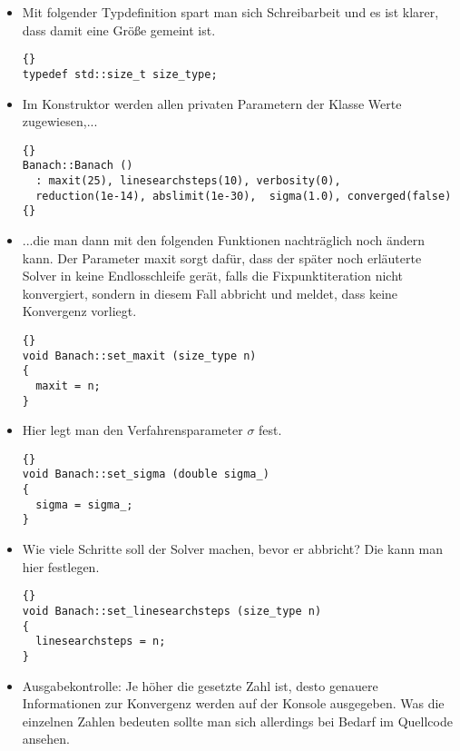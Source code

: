 \documentclass[a4paper,11pt]{article}
\theoremstyle{definition}
\begin{document}
\begin{itemize}
\item Mit folgender Typdefinition spart man sich Schreibarbeit und es
  ist klarer, dass damit eine Größe gemeint ist.

  {\footnotesize{\begin{lstlisting}{}
typedef std::size_t size_type;
\end{lstlisting}}}

\item Im Konstruktor werden allen privaten Parametern der Klasse Werte
  zugewiesen,...

{\footnotesize{\begin{lstlisting}{}
Banach::Banach ()
  : maxit(25), linesearchsteps(10), verbosity(0),
  reduction(1e-14), abslimit(1e-30),  sigma(1.0), converged(false)
{}
\end{lstlisting}}}

\item ...die man dann mit den folgenden Funktionen nachträglich noch
  ändern kann. Der Parameter \glqq maxit\grqq{}  sorgt dafür, dass der
  später noch erläuterte Solver in keine Endlosschleife gerät, falls
  die Fixpunktiteration nicht konvergiert, sondern in diesem Fall
  abbricht und meldet, dass keine Konvergenz vorliegt.

  {\footnotesize{\begin{lstlisting}{}
void Banach::set_maxit (size_type n)
{
  maxit = n;
}
\end{lstlisting}}}

\item Hier legt man den Verfahrensparameter $\sigma$ fest.

  {\footnotesize{\begin{lstlisting}{}
void Banach::set_sigma (double sigma_)
{
  sigma = sigma_;
}
\end{lstlisting}}}

\item Wie viele Schritte soll der Solver machen, bevor er abbricht?
  Die kann man hier festlegen.

{\footnotesize{\begin{lstlisting}{}
void Banach::set_linesearchsteps (size_type n)
{
  linesearchsteps = n;
}
\end{lstlisting}}}

\item Ausgabekontrolle: Je höher die gesetzte Zahl ist, desto genauere
  Informationen zur Konvergenz werden auf der Konsole ausgegeben. Was
  die einzelnen Zahlen bedeuten sollte man sich allerdings bei Bedarf
  im Quellcode ansehen.


\end{itemize}
\end{document}
